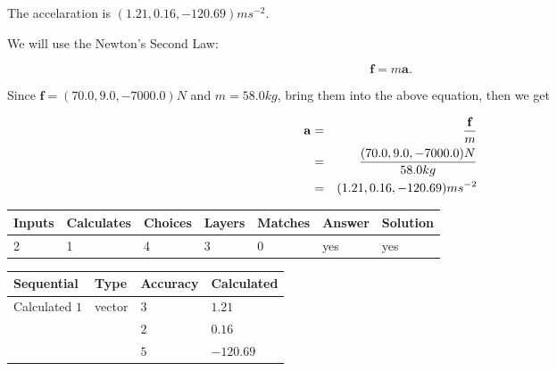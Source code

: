 \documentclass[12pt]{article}
\begin{document}
 
  The accelaration is $  %
(
1.21,
0.16,
-120.69)
ms^{-2} $.
 
 
\noindent{}
 
 
 
 
 
\noindent{}
 
 

We will use the Newton's Second Law:
 
\[
\mathbf{f}=m\mathbf{a}.
\]
 
Since $\mathbf{f}= %
(70.0 , 9.0 , -7000.0) N$
and $m= %
58.0kg$, bring them into the above equation, then we get
 
\begin{eqnarray*}
\mathbf{a}&=&\frac{\mathbf{f}}m  \\
&=&\frac{ %
(70.0 , 9.0 , -7000.0) N}{ %
58.0kg}  \\
&=& %
(1.21 , 0.16 , -120.69) ms^{-2}
\end{eqnarray*}
 
 
 
\noindent{}
 
 

 
 
\vspace{0.3in}
   
   
   
   
\noindent\begin{tabular}{|l|l|l|l|l|l|l|}
 \hline
Inputs & Calculates & Choices & Layers & Matches & Answer & Solution \\ \hline
           2  & 
           1  & 
           4
  & 
           3  & 
           0  & 
  yes & 
  yes 
  \\ \hline
 \end{tabular}
   
   
   
   
\noindent{}
   
   
  
  
\noindent\begin{tabular}{|l|l|l|l|}
\hline
 Sequential & Type & Accuracy & Calculated \\ 
\hline
 
 
  Calculated $            1 $ & vector &  
  $            3  $ 
 &  $ 1.21 $ 
 \\    
  & & 
  $            2  $ 
 &  $ 0.16 $ 
 \\    
  & & 
  $            5  $ 
 &  $ -120.69 $ 
 \\  \hline  
 \end{tabular}
   
\end{document}
